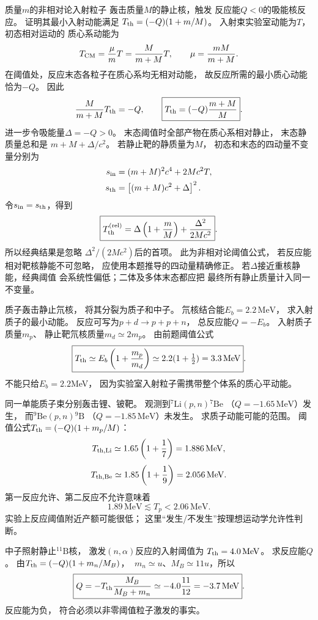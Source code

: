 质量$m$的非相对论入射粒子
轰击质量$M$的静止核，触发
反应能$Q<0$的吸能核反应。
证明其最小入射动能满足
$T_{\rm th}=(-Q)(1+m/M)$。
\exsolution
入射束实验室动能为$T$，初态相对运动的
质心系动能为
\[
 T_{\rm CM}=\frac{\mu}{m}T
 =\frac{M}{m+M}T,\qquad
 \mu=\frac{mM}{m+M}.
\]
在阈值处，反应末态各粒子在质心系均无相对动能，
故反应所需的最小质心动能恰为$-Q$。
因此
\[
 \frac{M}{m+M}T_{\rm th}=-Q,\qquad
 \boxed{T_{\rm th}=(-Q)\frac{m+M}{M}}.
\]
进一步令吸能量$\Delta=-Q>0$。
末态阈值时全部产物在质心系相对静止，
末态静质量总和是
$m+M+\Delta/c^2$。
若静止靶的静质量为$M$，
初态和末态的四动量不变量分别为
\[
 \begin{aligned}
 s_{\rm in}&=(m+M)^2c^4+2Mc^2T,\\
 s_{\rm th}&=\left[(m+M)c^2+\Delta\right]^2.
 \end{aligned}
\]
令$s_{\rm in}=s_{\rm th}$，得到
\[
 \boxed{T_{\rm th}^{\rm(rel)}
 =\Delta\left(1+\frac mM\right)
 +\frac{\Delta^2}{2Mc^2}}.
\]
所以经典结果是忽略
$\Delta^2/(2Mc^2)$后的首项。
\excheck 此为非相对论阈值公式，
若反应能相对靶核静能不可忽略，
应使用本题推导的四动量精确修正。
若$\Delta$接近重核静能，经典阈值
会系统性偏低；二体及多体末态都应把
最终所有静止质量计入同一不变量。

质子轰击静止氘核，
将其分裂为质子和中子。
氘核结合能$E_b=2.2\,\mathrm{MeV}$，
求入射质子的最小动能。
\exsolution
反应可写为$p+d\to p+p+n$，
总反应能$Q=-E_b$。
入射质子质量$m_p$、
静止靶氘核质量$m_d\simeq2m_p$。
由前题阈值公式
\[
 \boxed{T_{\rm th}\simeq
 E_b\left(1+\frac{m_p}{m_d}\right)
 \simeq2.2(1+\tfrac12)
 =3.3\,\mathrm{MeV}}.
\]
\excheck 不能只给$E_b=2.2$MeV，
因为实验室入射粒子需携带整个体系的质心平动能。

同一单能质子束分别轰击锂、铍靶。
观测到$^{7}\mathrm{Li}(p,n){}^{7}\mathrm{Be}$
（$Q=-1.65\,\mathrm{MeV}$）发生，
而$^{9}\mathrm{Be}(p,n){}^{9}\mathrm B$
（$Q=-1.85\,\mathrm{MeV}$）未发生。
求质子动能可能的范围。
\exsolution
阈值公式$T_{\rm th}=(-Q)(1+m_p/M)$：
\[
 T_{{\rm th},\mathrm{Li}}
 \simeq1.65\left(1+\frac17\right)
 =1.886\,\mathrm{MeV},
\]
\[
 T_{{\rm th},\mathrm{Be}}
 \simeq1.85\left(1+\frac19\right)
 =2.056\,\mathrm{MeV}.
\]
第一反应允许、第二反应不允许意味着
\[
 \boxed{1.89\,\mathrm{MeV}\lesssim T_p
 <2.06\,\mathrm{MeV}}.
\]
\excheck 实验上反应阈值附近产额可能很低；
这里“发生/不发生”按理想运动学允许性判断。

中子照射静止$^{11}\mathrm B$核，
激发$(n,\alpha)$反应的入射阈值为
$T_{\rm th}=4.0\,\mathrm{MeV}$。
求反应能$Q$。
\exsolution
由$T_{\rm th}=(-Q)(1+m_n/M_B)$，
$\;m_n\simeq u$、$M_B\simeq11u$，所以
\[
 \boxed{Q=-T_{\rm th}\frac{M_B}{M_B+m_n}
 \simeq-4.0\frac{11}{12}
 =-3.7\,\mathrm{MeV}}.
\]
\excheck 反应能为负，
符合必须以非零阈值粒子激发的事实。

